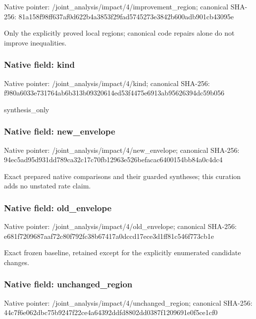 \documentclass[10pt,a4paper]{article}
\begin{document}
Native pointer: /joint\_analysis/impact/4\allowbreak{}/improvement\_region; canonical SHA-256: 81a158f98ff637af0d622b4a\allowbreak{}3853f29fad5745273e3842b6\allowbreak{}00adb901cb43095e


Only the explicitly proved local regions; canonical code repairs alone do not improve inequalities.


\subsubsection{Native field: kind}


Native pointer: /joint\_analysis/impact/4/kind; canonical SHA-256: f980a6033e731764ab6b313b\allowbreak{}09320614ed53f4475e6913ab\allowbreak{}95626394dc59b056


synthesis\_only


\subsubsection{Native field: new\_envelope}


Native pointer: /joint\_analysis/impact/4/new\_envelope; canonical SHA-256: 94ec5ad95d931dd789ca32c1\allowbreak{}7c70fb12963e526befacac64\allowbreak{}00154bb84a0c4dc4


Exact prepared native comparisons and their guarded syntheses; this curation adds no unstated rate claim.


\subsubsection{Native field: old\_envelope}


Native pointer: /joint\_analysis/impact/4/old\_envelope; canonical SHA-256: e681f7209687aaf72c80f792\allowbreak{}fc38b67417a0dccd17ece3d1\allowbreak{}ff81c546f773cb1e


Exact frozen baseline, retained except for the explicitly enumerated candidate changes.


\subsubsection{Native field: unchanged\_region}


Native pointer: /joint\_analysis/impact/4\allowbreak{}/unchanged\_region; canonical SHA-256: 44c7f6e062dbc75b9247f22c\allowbreak{}e4a64392ddfd8802dd0387f1\allowbreak{}209691e0f5ce1cf0
\end{document}
